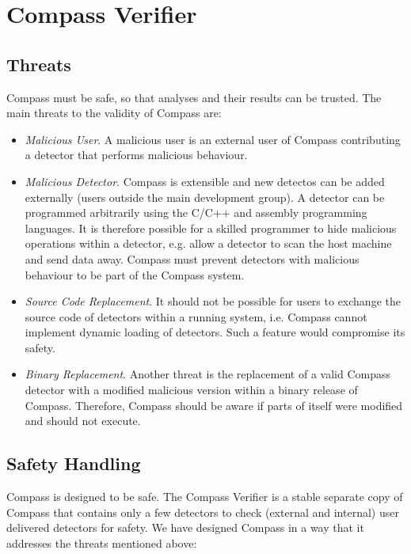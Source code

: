 \section{Compass Verifier}

\subsection{Threats} 

Compass must be safe, so that analyses and their results can be trusted. 
The main threats to the validity of Compass are:

\begin{itemize}
\item \emph{Malicious User}. A malicious user is an external user of Compass contributing a detector that performs malicious behaviour.  
\item \emph{Malicious Detector}. Compass is extensible and new detectos can be added externally (users outside the main development group).
  A detector can be programmed arbitrarily using the C/C++ and assembly programming languages. 
  It is therefore possible for a skilled programmer to hide malicious operations within a detector, e.g. allow a detector to scan the host machine and
  send data away. Compass must prevent detectors with malicious behaviour to be part of the Compass system. 
\item \emph{Source Code Replacement}. It should not be possible for users to exchange the source code of detectors within a running system,
  i.e. Compass cannot implement dynamic loading of detectors. Such a feature would compromise its safety.
\item \emph{Binary Replacement}. Another threat is the replacement of a valid Compass detector with a modified malicious version within a binary release of Compass.
  Therefore, Compass should be aware if parts of itself were modified and should not execute.
\end{itemize} 

\subsection{Safety Handling}

Compass is designed to be safe. The Compass Verifier is a stable separate copy of Compass that contains only a few detectors
to check (external and internal) user delivered detectors for safety. We have designed Compass in a way that it addresses the threats mentioned above:

